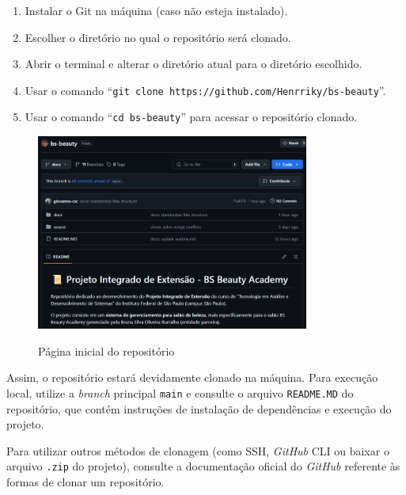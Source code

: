 \begin{enumerate}
	\item Instalar o Git na máquina (caso não esteja instalado).
	\item Escolher o diretório no qual o repositório será clonado.
	\item Abrir o terminal e alterar o diretório atual para o diretório escolhido.
	\item Usar o comando ``\texttt{git clone https://github.com/Henrriky/bs-beauty}''.
	\item Usar o comando ``\texttt{cd bs-beauty}'' para acessar o repositório clonado.
\end{enumerate}

\begin{figure}[h]
	\centering
	\caption{Página inicial do repositório}
	\includegraphics[width=0.8\textwidth]{cap03-gestao/imagens/bsbeauty-repositorio.png}
	\label{fig:inicio-repositorio}
\end{figure}

Assim, o repositório estará devidamente clonado na máquina. Para execução local, utilize a \textit{branch} principal \texttt{main} e consulte o arquivo \texttt{README.MD} do repositório, que contém instruções de instalação de dependências e execução do projeto.

Para utilizar outros métodos de clonagem (como SSH, \emph{GitHub} CLI ou baixar o arquivo \texttt{.zip} do projeto), consulte a documentação oficial do \emph{GitHub} \cite{clone-2025} referente às formas de clonar um repositório.